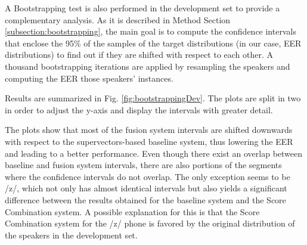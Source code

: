 A Bootstrapping test is also performed in the development set to provide a complementary
analysis. As it is described in Method Section \ref{subsection:bootstrapping}, the main goal
is to compute the confidence intervals that enclose the 95\% of the samples of
the target distributions (in our case, EER distributions) to find out if they are shifted
with respect to each other. A thousand bootstrapping iterations are applied by resampling
the speakers and computing the EER those speakers' instances.

Results are summarized in Fig. \ref{fig:bootstrappingDev}.
The plots are split in two in order to adjust the y-axis and display the intervals
with greater detail.

The plots show that most of the fusion system intervals are shifted downwards with
respect to the supervectors-based baseline system, thus lowering the EER and leading
to a better performance.
Even though there exist an overlap
between baseline and fusion system intervals, there are also portions of the segments
where the confidence intervals do not overlap. The only exception seems to be /z/, which
not only has almost identical intervals but also yields a significant difference
between the results obtained for the baseline system and the Score Combination system.
A possible explanation for this is that the Score Combination system for the /z/
phone is favored by the original distribution of the speakers in the development set.

